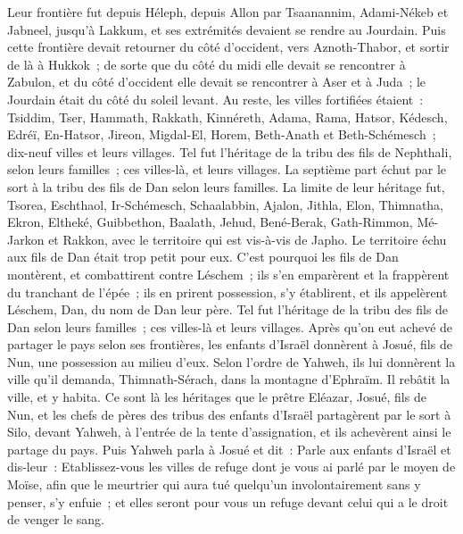 \begin{multicols}{2}
Leur frontière fut depuis Héleph, depuis Allon par Tsaanannim, Adami-Nékeb et Jabneel, jusqu'à Lakkum, et ses extrémités devaient se rendre au Jourdain.
Puis cette frontière devait retourner du côté d'occident, vers Aznoth-Thabor, et sortir de là à Hukkok~; de sorte que du côté du midi elle devait se rencontrer à Zabulon, et du côté d'occident elle devait se rencontrer à Aser et à Juda~; le Jourdain était du côté du soleil levant.
Au reste, les villes fortifiées étaient~: Tsiddim, Tser, Hammath, Rakkath, Kinnéreth,
Adama, Rama, Hatsor,
Kédesch, Edréï, En-Hatsor,
Jireon, Migdal-El, Horem, Beth-Anath et Beth-Schémesch~; dix-neuf villes et leurs villages.
Tel fut l'héritage de la tribu des fils de Nephthali, selon leurs familles~; ces villes-là, et leurs villages.
La septième part échut par le sort à la tribu des fils de Dan selon leurs familles.
La limite de leur héritage fut, Tsorea, Eschthaol, Ir-Schémesch,
Schaalabbin, Ajalon, Jithla,
Elon, Thimnatha, Ekron,
Eltheké, Guibbethon, Baalath,
Jehud, Bené-Berak, Gath-Rimmon,
Mé-Jarkon et Rakkon, avec le territoire qui est vis-à-vis de Japho.
Le territoire échu aux fils de Dan était trop petit pour eux. C'est pourquoi les fils de Dan montèrent, et combattirent contre Léschem~; ils s'en emparèrent et la frappèrent du tranchant de l'épée~; ils en prirent possession, s'y établirent, et ils appelèrent Léschem, Dan, du nom de Dan leur père.
Tel fut l'héritage de la tribu des fils de Dan selon leurs familles~; ces villes-là et leurs villages.
Après qu'on eut achevé de partager le pays selon ses frontières, les enfants d'Israël donnèrent à Josué, fils de Nun, une possession au milieu d'eux.
Selon l'ordre de Yahweh, ils lui donnèrent la ville qu'il demanda, Thimnath-Sérach, dans la montagne d'Ephraïm. Il rebâtit la ville, et y habita.
Ce sont là les héritages que le prêtre Eléazar, Josué, fils de Nun, et les chefs de pères des tribus des enfants d'Israël partagèrent par le sort à Silo, devant Yahweh, à l'entrée de la tente d'assignation, et ils achevèrent ainsi le partage du pays.
\VerseOne{}Puis Yahweh parla à Josué et dit~:
Parle aux enfants d'Israël et dis-leur~: Etablissez-vous les villes de refuge dont je vous ai parlé par le moyen de Moïse,
afin que le meurtrier qui aura tué quelqu'un involontairement sans y penser, s'y enfuie~; et elles seront pour vous un refuge devant celui qui a le droit de venger le sang.

\end{multicols}

